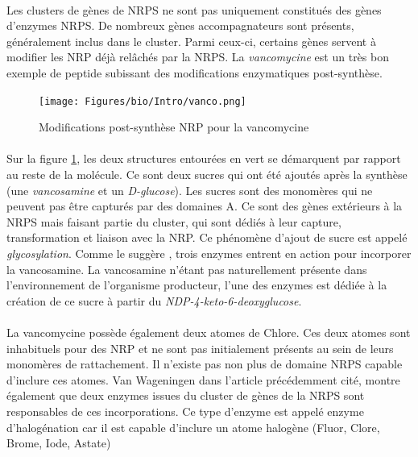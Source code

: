 \documentclass[12pt,french,twoside]{report}
\begin{document}
\label{sucres}

\paragraph{}Les clusters de gènes de NRPS ne sont pas uniquement constitués des gènes d'enzymes NRPS.
De nombreux gènes accompagnateurs sont présents, généralement inclus dans le cluster.
Parmi ceux-ci, certains gènes servent à modifier les NRP déjà relâchés par la NRPS.
La \textit{vancomycine} est un très bon exemple de peptide subissant des modifications enzymatiques post-synthèse.

\begin{figure}[h!]
  \begin{center}
    \texttt{[image: Figures/bio/Intro/vanco.png]}
    \caption{\label{vanco}Modifications post-synthèse NRP pour la vancomycine}
  \end{center}
\end{figure}

\paragraph{}Sur la figure \ref{vanco}, les deux structures entourées en vert se démarquent par rapport au reste de la molécule.
Ce sont deux sucres qui ont été ajoutés après la synthèse (une \textit{vancosamine} et un \textit{D-glucose}).
Les sucres sont des monomères qui ne peuvent pas être capturés par des domaines A.
Ce sont des gènes extérieurs à la NRPS mais faisant partie du cluster, qui sont dédiés à leur capture, transformation et liaison avec la NRP.
Ce phénomène d'ajout de sucre est appelé \textit{glycosylation}.
Comme le suggère \cite{van_wageningen_sequencing_1998}, trois enzymes entrent en action pour incorporer la vancosamine.
La vancosamine n'étant pas naturellement présente dans l'environnement de l'organisme producteur, l'une des enzymes est dédiée à la création de ce sucre à partir du \textit{NDP-4-keto-6-deoxyglucose}.

\paragraph{}La vancomycine possède également deux atomes de Chlore.
Ces deux atomes sont inhabituels pour des NRP et ne sont pas initialement présents au sein de leurs monomères de rattachement.
Il n'existe pas non plus de domaine NRPS capable d'inclure ces atomes.
Van Wageningen dans l'article précédemment cité, montre également que deux enzymes issues du cluster de gènes de la NRPS sont responsables de ces incorporations.
Ce type d'enzyme est appelé enzyme d'halogénation car il est capable d'inclure un atome halogène (Fluor, Clore, Brome, Iode, Astate)
\end{document}
